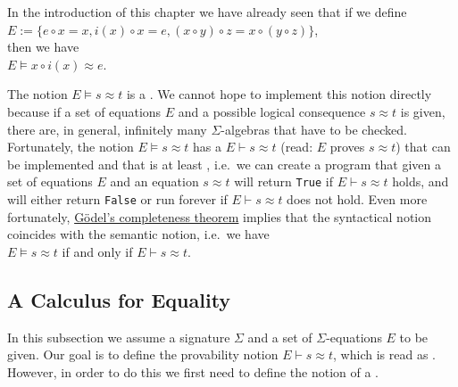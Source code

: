 \example
In the introduction of this chapter we have already seen that if we define
\\[0.2cm]
\hspace*{1.3cm}
$E := \bigl\{ e \circ x = x, i(x) \circ x = e, (x \circ y) \circ z = x \circ (y \circ z) \bigr\}$,
\\[0.2cm]
then we have
\\[0.2cm]
\hspace*{1.3cm}
$E \models x \circ i(x) \approx e$.  \eox

The notion $E \models s \approx t$ is a .  We cannot hope to implement this notion directly
because if a set of equations $E$ and a possible logical consequence $s \approx t$ is given, there are, in
general, infinitely many $\Sigma$-algebras that have to be checked.  Fortunately, the notion 
$E \models s \approx t$ has a  $E \vdash s \approx t$ (read: $E$ proves $s \approx t$)
that can be implemented and that is at least , i.e.~we can create a program that given 
a set of equations $E$ and an equation $s \approx t$ will return \texttt{True} if $E \vdash s \approx t$ holds, and will
either return \texttt{False} or run forever if $E \vdash s \approx t$ does not hold.  Even more fortunately,
\href{https://en.wikipedia.org/wiki/G%C3%B6del%27s_completeness_theorem}{G\"{o}del's completeness theorem} 
implies that the syntactical notion coincides with the semantic notion, i.e.~we have
\\[0.2cm]
\hspace*{1.3cm}
$E \models s \approx t$ \quad if and only if \quad $E \vdash s \approx t$.

\subsection{A Calculus for Equality}
In this subsection we assume a signature $\Sigma$ and a set of $\Sigma$-equations $E$ to be given.  
Our goal is to define the provability notion $E \vdash s \approx t$, which is read as .
However, in order to do this we first need to define 
the notion of a .

